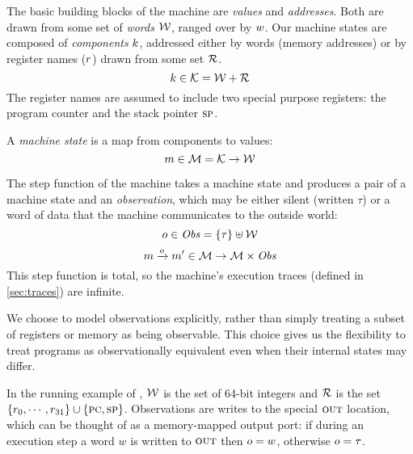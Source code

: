 \documentclass[acmsmall,review,anonymous]{acmart}\settopmatter{printfolios=true,printccs=false,printacmref=false}
\begin{document}
The basic building blocks of the machine are {\em values} and {\em addresses}.
Both are drawn from some set of {\em words} \(\WORDS\), ranged over by \(\word\).
%
Our machine states are composed of {\em components} \(\component\), addressed either by
words (memory addresses) or by register names (\(\reg\)) drawn from some set
\(\REGS\).
%
    \[\component \in \COMPONENTS = \WORDS + \REGS \]
%
The register names are assumed to include two special purpose registers: the
program counter {\PCname} and the stack pointer \(\SP\).

A {\em machine state} is a map from components to values:
%
\[\mach \in \MACHS = \COMPONENTS \rightarrow \WORDS\]

The step function of the machine takes a machine state and produces a
pair of a machine state and an {\em observation}, which may be either
silent (written \(\tau\)) or a word of data that the machine
communicates to the outside world:
\ifaftersubmission{}\fi
%
\[\obs \in \OBSS = \{\tau\} \uplus \WORDS\]
\[\mach \stepstoobs[\obs] \mach' \in \MACHS \rightarrow \MACHS \times \OBSS \]
%
This step function is total, so the machine's execution traces
(defined in \cref{sec:traces}) are infinite.

We choose to model observations explicitly, rather than simply treating
a subset of registers or memory as being observable.  This choice gives
us the flexibility to treat programs as observationally equivalent even when
their internal states may differ.

In the running example of ,
$\WORDS$ is the
set of 64-bit integers and $\REGS$ is the set $\{r_0, \cdots, r_{31}\}
\cup \{\PCname,\SP\}$. Observations are writes to the
special $\rout$ location\ifaftersubmission{}\fi, which can be thought of as a memory-mapped
  output port: if during an execution step a word $w$ is
written to $\rout$ then $\obs = w$, otherwise $\obs = \tau$.
\end{document}
